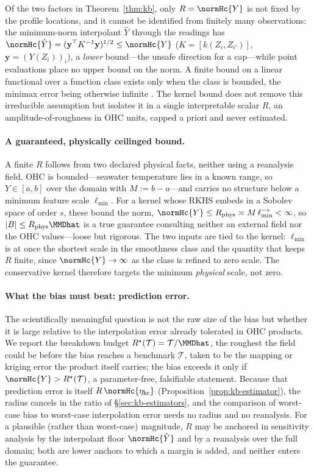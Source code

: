 Of the two factors in Theorem~\ref{thm:kb}, only $R=\normHc{Y}$ is not fixed by the
profile locations, and it cannot be identified from finitely many observations: the
minimum-norm interpolant $\hat Y$ through the readings has
$\normHc{\hat Y}=(\mathbf y^\top K^{-1}\mathbf y)^{1/2}\le\normHc{Y}$
($K=[k(Z_i,Z_{i'})]$, $\mathbf y=(Y(Z_i))_i$), a \emph{lower} bound---the unsafe
direction for a cap---while point evaluations place no upper bound on the norm. A
finite bound on a linear functional over a function class exists only when the class
is bounded, the minimax error being otherwise infinite
\citep{donoho1994,micchelli1977}. The kernel bound does not remove this irreducible
assumption but isolates it in a single interpretable scalar $R$, an
amplitude-of-roughness in OHC units, capped a priori and never estimated.

\paragraph{A guaranteed, physically ceilinged bound.}
A finite $R$ follows from two declared physical facts, neither using a reanalysis
field. OHC is bounded---seawater temperature lies in a known range, so
$Y\in[a,b]$ over the domain with $M:=b-a$---and carries no structure below a minimum
feature scale $\ell_{\min}$. For a kernel whose RKHS embeds in a Sobolev space of
order $s$, these bound the norm, $\normHc{Y}\le R_{\mathrm{phys}}\asymp M\,\ell_{\min}^{-s}<\infty$,
so $|B|\le R_{\mathrm{phys}}\MMDhat$ is a true guarantee consulting neither an
external field nor the OHC values---loose but rigorous. The two inputs are tied to
the kernel: $\ell_{\min}$ is at once the shortest scale in the smoothness class and
the quantity that keeps $R$ finite, since $\normHc{Y}\to\infty$ as the class is
refined to zero scale. The conservative kernel therefore targets the minimum
\emph{physical} scale, not zero.

\paragraph{What the bias must beat: prediction error.}
The scientifically meaningful question is not the raw size of the bias but whether
it is large relative to the interpolation error already tolerated in OHC products.
We report the breakdown budget $R^{\star}(\mathcal T)=\mathcal T/\MMDhat$, the
roughest the field could be before the bias reaches a benchmark $\mathcal T$, taken
to be the mapping or kriging error the product itself carries; the bias exceeds it
only if $\normHc{Y}>R^{\star}(\mathcal T)$, a parameter-free, falsifiable statement.
Because that prediction error is itself $R\,\normHc{\eta_{\mathrm{kr}}}$
(Proposition~\ref{prop:kb-estimator}), the radius cancels in the ratio of
\S\ref{sec:kb-estimators}, and the comparison of worst-case bias to worst-case
interpolation error needs no radius and no reanalysis. For a plausible (rather than
worst-case) magnitude, $R$ may be anchored in sensitivity analysis by the
interpolant floor $\normHc{\hat Y}$ and by a reanalysis over the full domain; both
are lower anchors to which a margin is added, and neither enters the guarantee.

